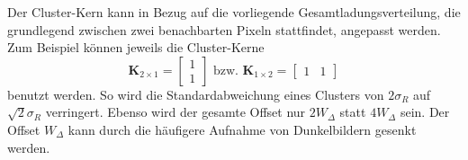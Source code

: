 \noindent
Der Cluster-Kern kann in Bezug auf die vorliegende Gesamtladungsverteilung, die grundlegend zwischen zwei benachbarten Pixeln stattfindet, angepasst werden. Zum Beispiel können jeweils die Cluster-Kerne
\begin{equation}
    \mathbf{K}_{2\times1} = \begin{bmatrix}
1\\
1
\end{bmatrix}
\text{ bzw. }
    \mathbf{K}_{1\times2} = \begin{bmatrix}
1 & 1
\end{bmatrix}
\end{equation}
benutzt werden. So wird die Standardabweichung eines Clusters von $2\sigma_R$ auf $\sqrt{2}\sigma_R$ verringert. Ebenso wird der gesamte Offset nur $2W_\Delta$ statt $4W_\Delta$ sein. Der Offset $W_\Delta$ kann durch die häufigere Aufnahme von Dunkelbildern gesenkt werden.


